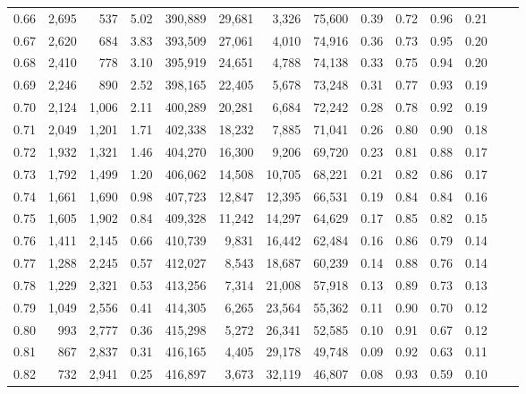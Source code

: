 \begin{tabular}{rrrrrrrrrrrrrr}
0.66 &  2,695 &    537 &     5.02 &  390,889 &   29,681 &   3,326 &  75,600 &  0.39 &  0.72 &  0.96 &      0.21 \\
0.67 &  2,620 &    684 &     3.83 &  393,509 &   27,061 &   4,010 &  74,916 &  0.36 &  0.73 &  0.95 &      0.20 \\
0.68 &  2,410 &    778 &     3.10 &  395,919 &   24,651 &   4,788 &  74,138 &  0.33 &  0.75 &  0.94 &      0.20 \\
0.69 &  2,246 &    890 &     2.52 &  398,165 &   22,405 &   5,678 &  73,248 &  0.31 &  0.77 &  0.93 &      0.19 \\
0.70 &  2,124 &  1,006 &     2.11 &  400,289 &   20,281 &   6,684 &  72,242 &  0.28 &  0.78 &  0.92 &      0.19 \\
0.71 &  2,049 &  1,201 &     1.71 &  402,338 &   18,232 &   7,885 &  71,041 &  0.26 &  0.80 &  0.90 &      0.18 \\
0.72 &  1,932 &  1,321 &     1.46 &  404,270 &   16,300 &   9,206 &  69,720 &  0.23 &  0.81 &  0.88 &      0.17 \\
0.73 &  1,792 &  1,499 &     1.20 &  406,062 &   14,508 &  10,705 &  68,221 &  0.21 &  0.82 &  0.86 &      0.17 \\
0.74 &  1,661 &  1,690 &     0.98 &  407,723 &   12,847 &  12,395 &  66,531 &  0.19 &  0.84 &  0.84 &      0.16 \\
0.75 &  1,605 &  1,902 &     0.84 &  409,328 &   11,242 &  14,297 &  64,629 &  0.17 &  0.85 &  0.82 &      0.15 \\
0.76 &  1,411 &  2,145 &     0.66 &  410,739 &    9,831 &  16,442 &  62,484 &  0.16 &  0.86 &  0.79 &      0.14 \\
0.77 &  1,288 &  2,245 &     0.57 &  412,027 &    8,543 &  18,687 &  60,239 &  0.14 &  0.88 &  0.76 &      0.14 \\
0.78 &  1,229 &  2,321 &     0.53 &  413,256 &    7,314 &  21,008 &  57,918 &  0.13 &  0.89 &  0.73 &      0.13 \\
0.79 &  1,049 &  2,556 &     0.41 &  414,305 &    6,265 &  23,564 &  55,362 &  0.11 &  0.90 &  0.70 &      0.12 \\
0.80 &    993 &  2,777 &     0.36 &  415,298 &    5,272 &  26,341 &  52,585 &  0.10 &  0.91 &  0.67 &      0.12 \\
0.81 &    867 &  2,837 &     0.31 &  416,165 &    4,405 &  29,178 &  49,748 &  0.09 &  0.92 &  0.63 &      0.11 \\
0.82 &    732 &  2,941 &     0.25 &  416,897 &    3,673 &  32,119 &  46,807 &  0.08 &  0.93 &  0.59 &      0.10 \\

\end{tabular}
